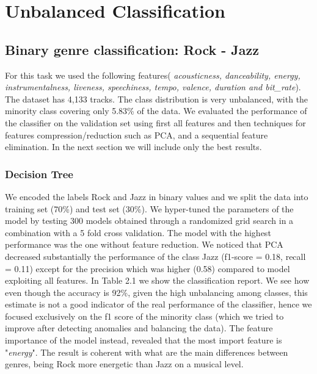 \section{Unbalanced Classification}
\subsection{Binary genre classification: Rock - Jazz}
For this task we used the following features(
\textit{acousticness, danceability, energy, instrumentalness, liveness, speechiness, tempo, valence, duration and bit\_rate}). The dataset has 4,133 tracks. The class distribution is very unbalanced, with the minority class covering only 5.83\% of the data.
We evaluated the performance of the classifier on the validation set using first all features and then techniques for features compression/reduction such as PCA, and a sequential feature elimination. 
In the next section we will include only the best results. 
\subsubsection{Decision Tree}
We encoded the labels Rock and Jazz in binary values and we split the data into training set (70\%) and test set (30\%). We hyper-tuned the parameters of the model by testing 300 models obtained through a randomized grid search in a combination with a 5 fold cross validation. The model with the highest performance was the one without feature reduction. We noticed that PCA decreased substantially the performance of the class Jazz (f1-score = 0.18, recall = 0.11) except for the precision which was higher (0.58) compared to model exploiting all features.
In Table 2.1 we show the classification report. We see how even though the accuracy is 92\%, given the high unbalancing among classes, this estimate is not a good indicator of the real performance of the classifier, hence we focused exclusively on the f1 score of the minority class (which we tried to improve after detecting anomalies and balancing the data). The feature importance of the model instead, revealed that the most import feature is "\textit{energy}". The result is coherent with what are the main differences between genres, being Rock more energetic than Jazz on a musical level. 

